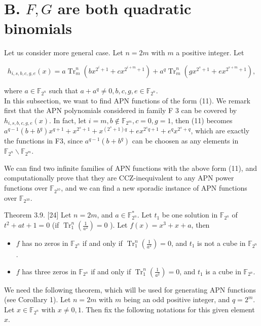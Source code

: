 \documentclass[10pt]{article}
\begin{document}
\section*{B. $F, G$ are both quadratic binomials}
Let us consider more general case. Let $n=2 m$ with $m$ a positive integer. Let


\begin{equation*}
h_{i, s, b, c, g, e}(x)=a \operatorname{Tr}_{m}^{n}\left(b x^{2^{i}+1}+c x^{2^{i+m}+1}\right)+a^{q} \operatorname{Tr}_{m}^{n}\left(g x^{2^{s}+1}+e x^{2^{s+m}+1}\right), \tag{11}
\end{equation*}


where $a \in \mathbb{F}_{2^{n}}$ such that $a+a^{q} \neq 0, b, c, g, e \in \mathbb{F}_{2^{n}}$.\\
In this subsection, we want to find APN functions of the form (11). We remark first that the APN polynomials considered in family F 3 can be covered by $h_{i, s, b, c, g, e}(x)$. In fact, let $i=m, b \notin \mathbb{F}_{2^{m}}, c=0, g=1$, then (11) becomes $a^{q-1}\left(b+b^{q}\right) x^{q+1}+x^{2^{s}+1}+x^{\left(2^{s}+1\right) q}+e x^{2^{s} q+1}+e^{q} x^{2^{s}+q}$, which are exactly the functions in F3, since $a^{q-1}\left(b+b^{q}\right)$ can be choosen as any elements in $\mathbb{F}_{2^{n}} \backslash \mathbb{F}_{2^{m}}$.

We can find two infinite families of APN functions with the above form (11), and computationally prove that they are CCZ-inequivalent to any APN power functions over $\mathbb{F}_{2^{10}}$, and we can find a new sporadic instance of APN functions over $\mathbb{F}_{2^{10}}$.

Theorem 3.9. [24] Let $n=2 m$, and $a \in \mathbb{F}_{2^{n}}^{*}$. Let $t_{1}$ be one solution in $\mathbb{F}_{2^{n}}$ of $t^{2}+a t+1=0$ (if $\operatorname{Tr}_{1}^{n}\left(\frac{1}{a^{2}}\right)=0$ ). Let $f(x)=x^{3}+x+a$, then

\begin{itemize}
  \item $f$ has no zeros in $\mathbb{F}_{2^{n}}$ if and only if $\operatorname{Tr}_{1}^{n}\left(\frac{1}{a^{2}}\right)=0$, and $t_{1}$ is not a cube in $\mathbb{F}_{2^{n}}$.
  \item $f$ has three zeros in $\mathbb{F}_{2^{n}}$ if and only if $\operatorname{Tr}_{1}^{n}\left(\frac{1}{a^{2}}\right)=0$, and $t_{1}$ is a cube in $\mathbb{F}_{2^{n}}$.
\end{itemize}

We need the following theorem, which will be used for generating APN functions (see Corollary 1). Let $n=2 m$ with $m$ being an odd positive integer, and $q=2^{m}$. Let $x \in \mathbb{F}_{2^{n}}$ with $x \neq 0,1$. Then fix the following notations for this given element $x$.
\end{document}
